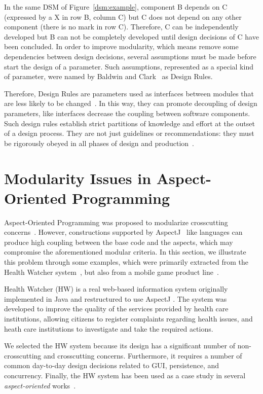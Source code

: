 In the same DSM of Figure~\ref{dsm:example}, component B depends on C (expressed
by a X in row B, column C) but C does not depend on any other component (there is
no mark in row C). Therefore, C can be independently developed but B can not be
completely developed until design decisions of C have been concluded. In order to
improve modularity, which means remove some dependencies between design
decisions, several assumptions must be made before start the design of a
parameter. Such assumptions, represented as a special kind of parameter,
were named by Baldwin and Clark~\cite{clark-design-rules-book} as Design Rules.

Therefore, Design Rules are parameters used as interfaces between modules that
are less likely to be changed~\cite{lopes-taosd-2006}. In this way, they can promote decoupling
of design parameters, like interfaces decrease the coupling between software
components. Such design rules establish strict partitions of knowledge and effort at the
outset of a design process. They are not just guidelines or recommendations: they must
be rigorously obeyed in all phases of design and production~\cite{clark-design-rules-book}.

\section{Modularity Issues in Aspect-Oriented Programming}\label{sec:aop-issues}

Aspect-Oriented Programming was proposed to modularize crosscutting
concerns~\cite{kiczales-ecoop-1997}. However, constructions supported by
AspectJ~\cite{kiczales-cacm-2001} like languages can produce high
coupling between the base code and the aspects, which may compromise
the aforementioned modular criteria. In this section, we illustrate
this problem through some examples, which were primarily extracted from 
the Health Watcher system~\cite{soares-oopsla-02}, but also from a mobile 
game product line~\cite{a}.

Health Watcher (HW) is a real web-based information system
originally implemented in Java and restructured to use AspectJ
\cite{kiczales-cacm-2001}. The system was developed to improve the quality
of the services provided by health care institutions, allowing citizens
to register complaints regarding health issues, and heath care
institutions to investigate and take the required actions. 

We  selected the HW system because its design has a significant number of
non-crosscutting and crosscutting concerns. Furthermore, it requires a number of
common day-to-day design decisions related to GUI, persistence, and concurrency.
Finally, the HW system has been used as a case study in several
\emph{aspect-oriented} works~\cite{greenwood-ecoop-2007, greenwood-ea-2007,
soares-oopsla-02}.


